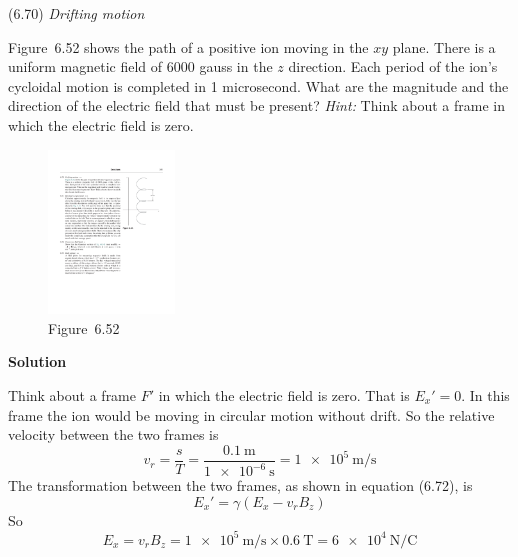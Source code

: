 \documentclass{article}
\begin{document}
\begin{homeworkProblem}
	(6.70) \textit{Drifting motion}

	Figure~6.52 shows the path of a positive ion moving in the $xy$ plane. There is a uniform magnetic field of 6000 gauss in the $z$ direction. Each period of the ion's cycloidal motion is completed in 1 microsecond. What are the magnitude and the direction of the electric field that must be present? \textit{Hint:} Think about a frame in which the electric field is zero.
	\begin{figure}[H]
		\centering
		\includegraphics[width = 0.3\textwidth]{6_52.pdf}
		\caption*{Figure~6.52}
	\end{figure}

	\textbf{Solution}

	Think about a frame $F'$ in which the electric field is zero. That is ${E_x}'=0$. In this frame the ion would be moving in circular motion without drift. So the relative velocity between the two frames is
	\[
		v_r=\frac{s}{T}=\frac{\SI{0.1}{\m}}{\SI{1e-6}{\s}}=\SI{1e5}{\m\per\s}
	\]
	The transformation between the two frames, as shown in equation (6.72), is
	\[
		{E_x}'=\gamma(E_x-v_rB_z)
	\]
	So
	\[
		E_x=v_rB_z=\SI{1e5}{\m\per\s}\times\SI{0.6}{\tesla}=\SI{6e4}{\newton\per\coulomb}
	\]
\end{homeworkProblem}

\end{document}
